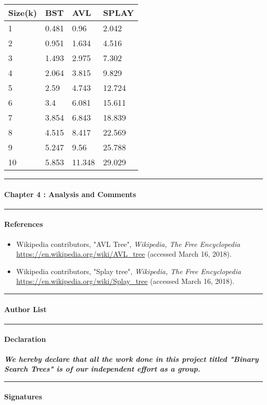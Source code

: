 \documentclass[]{article}
\let\oldparagraph\paragraph
\renewcommand{\paragraph}[1]{\oldparagraph{#1}\mbox{}}
\begin{document}
\begin{longtable}[]{@{}llll@{}}
\toprule
Size(k) & BST & AVL & SPLAY\tabularnewline
\midrule
\endhead
1 & 0.481 & 0.96 & 2.042\tabularnewline
2 & 0.951 & 1.634 & 4.516\tabularnewline
3 & 1.493 & 2.975 & 7.302\tabularnewline
4 & 2.064 & 3.815 & 9.829\tabularnewline
5 & 2.59 & 4.743 & 12.724\tabularnewline
6 & 3.4 & 6.081 & 15.611\tabularnewline
7 & 3.854 & 6.843 & 18.839\tabularnewline
8 & 4.515 & 8.417 & 22.569\tabularnewline
9 & 5.247 & 9.56 & 25.788\tabularnewline
10 & 5.853 & 11.348 & 29.029\tabularnewline
\bottomrule
\end{longtable}

\begin{center}\rule{0.5\linewidth}{\linethickness}\end{center}

\paragraph{Chapter 4 : Analysis and Comments}\label{header-n255}

\begin{center}\rule{0.5\linewidth}{\linethickness}\end{center}

\paragraph{References}\label{header-n259}

\begin{itemize}
\item
  Wikipedia contributors, "AVL Tree", \emph{Wikipedia, The Free
  Encyclopedia} \url{https://en.wikipedia.org/wiki/AVL_tree} (accessed
  March 16, 2018).
\item
  Wikipedia contributors, "Splay tree", \emph{Wikipedia, The Free
  Encyclopedia} \url{https://en.wikipedia.org/wiki/Splay_tree} (accessed
  March 16, 2018).
\end{itemize}

\begin{center}\rule{0.5\linewidth}{\linethickness}\end{center}

\paragraph{Author List}\label{header-n268}

\begin{center}\rule{0.5\linewidth}{\linethickness}\end{center}

\paragraph{Declaration}\label{header-n272}

 \textbf{\emph{We hereby declare that all the work done in this project
titled "Binary Search Trees" is of our independent effort as a group.}}

\begin{center}\rule{0.5\linewidth}{\linethickness}\end{center}

\paragraph{Signatures}\label{header-n276}
\end{document}
